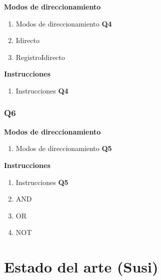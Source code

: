 \textbf{Modos de direccionamiento}
\begin{enumerate}
\item Modos de direccionamiento \textbf{Q4}
\item Idirecto
\item RegistroIdirecto
\end{enumerate}

\textbf{Instrucciones}
\begin{enumerate}
\item Instrucciones \textbf{Q4}
\end{enumerate}

\subsubsection{Q6}

\textbf{Modos de direccionamiento}
\begin{enumerate}
\item Modos de direccionamiento \textbf{Q5}
\end{enumerate}

\textbf{Instrucciones}
\begin{enumerate}
\item Instrucciones \textbf{Q5}
\item AND
\item OR
\item NOT
\end{enumerate}


\section{Estado del arte (Susi)}

